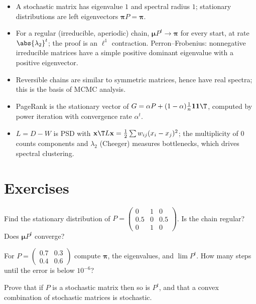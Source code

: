 \begin{summarybox}
\begin{itemize}
  \item A stochastic matrix has eigenvalue $1$ and spectral radius $1$; stationary distributions are left eigenvectors $\boldsymbol\pi P=\boldsymbol\pi$.
  \item For a regular (irreducible, aperiodic) chain, $\boldsymbol\mu P^t\to\boldsymbol\pi$ for every start, at rate $\abs{\lambda_2}^t$; the proof is an $\ell^1$ contraction. Perron--Frobenius: nonnegative irreducible matrices have a simple positive dominant eigenvalue with a positive eigenvector.
  \item Reversible chains are similar to symmetric matrices, hence have real spectra; this is the basis of MCMC analysis.
  \item PageRank is the stationary vector of $G=\alpha P+(1-\alpha)\tfrac1n\mathbf{1}\mathbf{1}\T$, computed by power iteration with convergence rate $\alpha^t$.
  \item $L=D-W$ is PSD with $\mathbf{x}\T L\mathbf{x}=\tfrac12\sum w_{ij}(x_i-x_j)^2$; the multiplicity of $0$ counts components and $\lambda_2$ (Cheeger) measures bottlenecks, which drives spectral clustering.
\end{itemize}
\end{summarybox}

\section{Exercises}

\begin{exercise}
Find the stationary distribution of $P=\begin{pmatrix}0&1&0\\0.5&0&0.5\\0&1&0\end{pmatrix}$. Is the chain regular? Does $\boldsymbol\mu P^t$ converge?
\end{exercise}

\begin{exercise}
For $P=\begin{pmatrix}0.7&0.3\\0.4&0.6\end{pmatrix}$ compute $\boldsymbol\pi$, the eigenvalues, and $\lim P^t$. How many steps until the error is below $10^{-6}$?
\end{exercise}

\begin{exercise}
Prove that if $P$ is a stochastic matrix then so is $P^t$, and that a convex combination of stochastic matrices is stochastic.
\end{exercise}

